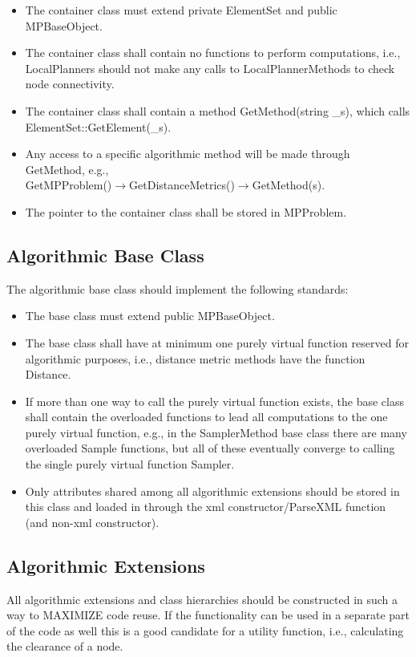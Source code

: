\documentclass[12pt]{article}
\begin{document}
\begin{itemize}
\item The container class must extend private ElementSet and public MPBaseObject.
\item The container class shall contain no functions to perform computations, i.e., LocalPlanners should not make any
calls to LocalPlannerMethods to check node connectivity.
\item The container class shall contain a method GetMethod(string \_s), which calls \\ElementSet::GetElement(\_s).
\item Any access to a specific algorithmic method will be made through GetMethod, e.g., \\
GetMPProblem()$\rightarrow$GetDistanceMetrics()$\rightarrow$GetMethod(s).
\item The pointer to the container class shall be stored in MPProblem.
\end{itemize}

\subsection{Algorithmic Base Class}
The algorithmic base class should implement the following standards:

\begin{itemize}
\item The base class must extend public MPBaseObject.
\item The base class shall have at minimum one purely virtual function reserved for algorithmic purposes, i.e., distance
metric methods have the function Distance.
\item If more than one way to call the purely virtual function exists, the base class shall contain the overloaded
functions to lead all computations to the one purely virtual function, e.g., in the SamplerMethod base class there are
many overloaded Sample functions, but all of these eventually converge to calling the single purely virtual function
Sampler.
\item Only attributes shared among all algorithmic extensions should be stored in this class and loaded in through the
xml constructor/ParseXML function (and non-xml constructor).
\end{itemize}

\subsection{Algorithmic Extensions}
All algorithmic extensions and class hierarchies should be constructed in such a way to MAXIMIZE code reuse. If the
functionality can be used in a separate part of the code as well this is a good candidate for a utility function, i.e.,
calculating the clearance of a node.
\end{document}
